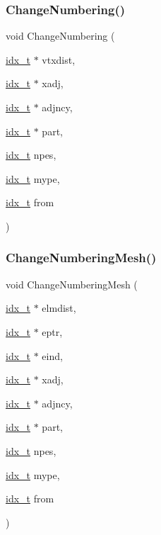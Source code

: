 \subsubsection{\texorpdfstring{Change\+Numbering()}{ChangeNumbering()}}
{\footnotesize\ttfamily void Change\+Numbering (\begin{DoxyParamCaption}\item[{\hyperlink{a00876_aaa5262be3e700770163401acb0150f52}{idx\+\_\+t} $\ast$}]{vtxdist,  }\item[{\hyperlink{a00876_aaa5262be3e700770163401acb0150f52}{idx\+\_\+t} $\ast$}]{xadj,  }\item[{\hyperlink{a00876_aaa5262be3e700770163401acb0150f52}{idx\+\_\+t} $\ast$}]{adjncy,  }\item[{\hyperlink{a00876_aaa5262be3e700770163401acb0150f52}{idx\+\_\+t} $\ast$}]{part,  }\item[{\hyperlink{a00876_aaa5262be3e700770163401acb0150f52}{idx\+\_\+t}}]{npes,  }\item[{\hyperlink{a00876_aaa5262be3e700770163401acb0150f52}{idx\+\_\+t}}]{mype,  }\item[{\hyperlink{a00876_aaa5262be3e700770163401acb0150f52}{idx\+\_\+t}}]{from }\end{DoxyParamCaption})}

\mbox{\label{a00398_aabf24a234bc50173d130585c678aad92}} 
\subsubsection{\texorpdfstring{Change\+Numbering\+Mesh()}{ChangeNumberingMesh()}}
{\footnotesize\ttfamily void Change\+Numbering\+Mesh (\begin{DoxyParamCaption}\item[{\hyperlink{a00876_aaa5262be3e700770163401acb0150f52}{idx\+\_\+t} $\ast$}]{elmdist,  }\item[{\hyperlink{a00876_aaa5262be3e700770163401acb0150f52}{idx\+\_\+t} $\ast$}]{eptr,  }\item[{\hyperlink{a00876_aaa5262be3e700770163401acb0150f52}{idx\+\_\+t} $\ast$}]{eind,  }\item[{\hyperlink{a00876_aaa5262be3e700770163401acb0150f52}{idx\+\_\+t} $\ast$}]{xadj,  }\item[{\hyperlink{a00876_aaa5262be3e700770163401acb0150f52}{idx\+\_\+t} $\ast$}]{adjncy,  }\item[{\hyperlink{a00876_aaa5262be3e700770163401acb0150f52}{idx\+\_\+t} $\ast$}]{part,  }\item[{\hyperlink{a00876_aaa5262be3e700770163401acb0150f52}{idx\+\_\+t}}]{npes,  }\item[{\hyperlink{a00876_aaa5262be3e700770163401acb0150f52}{idx\+\_\+t}}]{mype,  }\item[{\hyperlink{a00876_aaa5262be3e700770163401acb0150f52}{idx\+\_\+t}}]{from }\end{DoxyParamCaption})}


